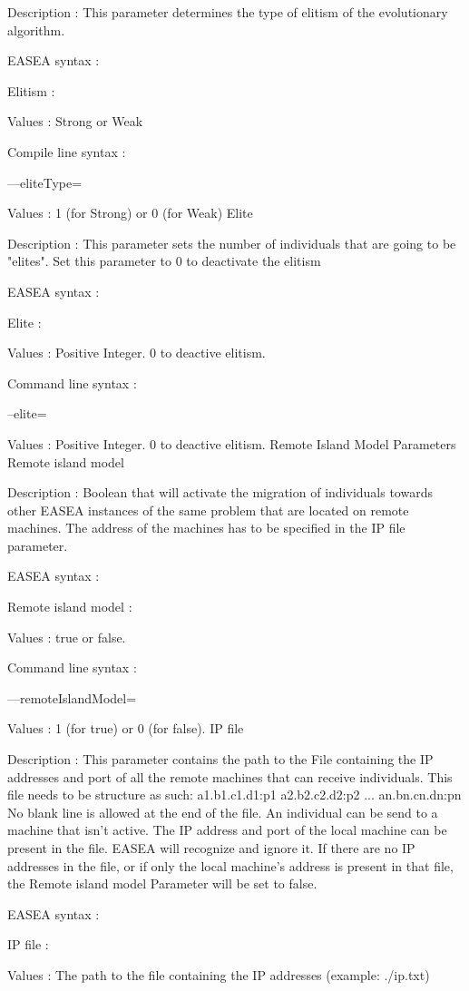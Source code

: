 \documentclass{article}
\begin{document}
Description :
This parameter determines the type of elitism of the evolutionary algorithm.

EASEA syntax :

Elitism :

Values : Strong or Weak

Compile line syntax :

---eliteType=

Values : 1 (for Strong) or 0 (for Weak)
Elite

Description :
This parameter sets the number of individuals that are going to be "elites". Set this parameter to 0 to deactivate the elitism

EASEA syntax :

Elite :

Values : Positive Integer. 0 to deactive elitism.

Command line syntax :

--elite=

Values : Positive Integer. 0 to deactive elitism.
Remote Island Model Parameters
Remote island model

Description :
Boolean that will activate the migration of individuals towards other EASEA instances of the same problem that are located on remote machines. The address of the machines has to be specified in the IP file parameter.

EASEA syntax :

Remote island model :

Values : true or false.

Command line syntax :

---remoteIslandModel=

Values : 1 (for true) or 0 (for false).
IP file

Description :
This parameter contains the path to the File containing the IP addresses and port of all the remote machines that can receive individuals. This file needs to be structure as such:
a1.b1.c1.d1:p1
a2.b2.c2.d2:p2
...
an.bn.cn.dn:pn
No blank line is allowed at the end of the file.
An individual can be send to a machine that isn't active.
The IP address and port of the local machine can be present in the file. EASEA will recognize and ignore it.
If there are no IP addresses in the file, or if only the local machine's address is present in that file, the Remote island model Parameter will be set to false.

EASEA syntax :

IP file :

Values : The path to the file containing the IP addresses (example: ./ip.txt)
\end{document}
